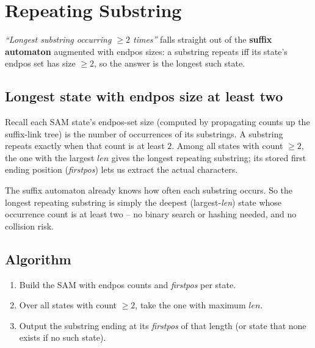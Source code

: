 \section{Repeating Substring}
\label{sec:cses-repeating-substring}


\begin{patternbox}
\emph{``Longest substring occurring $\ge2$ times''} falls straight out of
the \textbf{suffix automaton} augmented with endpos sizes: a substring
repeats iff its state's endpos set has size $\ge2$, so the answer is the
longest such state.
\end{patternbox}

\subsection*{Longest state with endpos size at least two}

Recall each SAM state's endpos-set size (computed by propagating counts up
the suffix-link tree) is the number of occurrences of its substrings. A
substring repeats exactly when that count is at least $2$. Among all states
with count $\ge2$, the one with the largest $\textit{len}$ gives the
longest repeating substring; its stored first ending position
(\textit{firstpos}) lets us extract the actual characters.

\begin{ideabox}[Repetition = Endpos Size $\ge 2$]
The suffix automaton already knows how often each substring occurs. So the
longest repeating substring is simply the deepest (largest-\textit{len})
state whose occurrence count is at least two -- no binary search or hashing
needed, and no collision risk.
\end{ideabox}

\subsection*{Algorithm}

\begin{enumerate}
  \item Build the SAM with endpos counts and \textit{firstpos} per state.
  \item Over all states with count $\ge2$, take the one with maximum
        $\textit{len}$.
  \item Output the substring ending at its \textit{firstpos} of that
        length (or state that none exists if no such state).
\end{enumerate}

